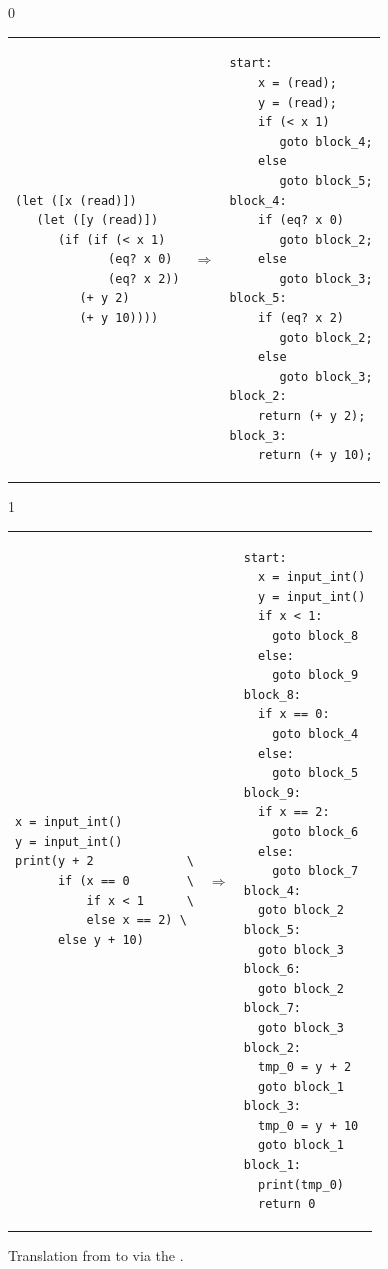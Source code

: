 \documentclass[7x10]{TimesAPriori_MIT}%
\def\racketEd{0}
\def\pythonEd{1}
\def\edition{0}
\numberwithin{theorem}{chapter}
\numberwithin{definition}{chapter}
\numberwithin{equation}{chapter}
\begin{document}
\begin{figure}[tbp]
\begin{tcolorbox}[colback=white]
{\if\edition\racketEd        
\begin{tabular}{lll}
\begin{minipage}{0.4\textwidth}
\begin{lstlisting}
(let ([x (read)])
   (let ([y (read)])
      (if (if (< x 1)
             (eq? x 0)
             (eq? x 2))
         (+ y 2)
         (+ y 10))))
\end{lstlisting}
\end{minipage}
&
$\Rightarrow$
&
\begin{minipage}{0.55\textwidth}
\begin{lstlisting}
start:
    x = (read);
    y = (read);
    if (< x 1)
       goto block_4;
    else
       goto block_5;
block_4:
    if (eq? x 0)
       goto block_2;
    else
       goto block_3;
block_5:
    if (eq? x 2)
       goto block_2;
    else
       goto block_3;
block_2:
    return (+ y 2);
block_3:
    return (+ y 10);
\end{lstlisting}
\end{minipage}
\end{tabular} 
\fi}
{\if\edition\pythonEd
\begin{tabular}{lll}
\begin{minipage}{0.4\textwidth}
\begin{lstlisting}
x = input_int()
y = input_int()
print(y + 2             \
      if (x == 0        \
          if x < 1      \
          else x == 2) \
      else y + 10)
\end{lstlisting}
\end{minipage}
&
$\Rightarrow$
&
\begin{minipage}{0.55\textwidth}
\begin{lstlisting}
start:
  x = input_int()
  y = input_int()
  if x < 1:
    goto block_8
  else:
    goto block_9
block_8:
  if x == 0:
    goto block_4
  else:
    goto block_5
block_9:
  if x == 2:
    goto block_6
  else:
    goto block_7
block_4:
  goto block_2
block_5:
  goto block_3
block_6:
  goto block_2
block_7:
  goto block_3
block_2:
  tmp_0 = y + 2
  goto block_1
block_3:
  tmp_0 = y + 10
  goto block_1
block_1:
  print(tmp_0)
  return 0
\end{lstlisting}
\end{minipage}
\end{tabular} 
\fi}
\end{tcolorbox}
\caption{Translation from \LangIf{} to \LangCIf{}
  via the .}
\label{fig:explicate-control-s1-38}
\end{figure}
\end{document}
